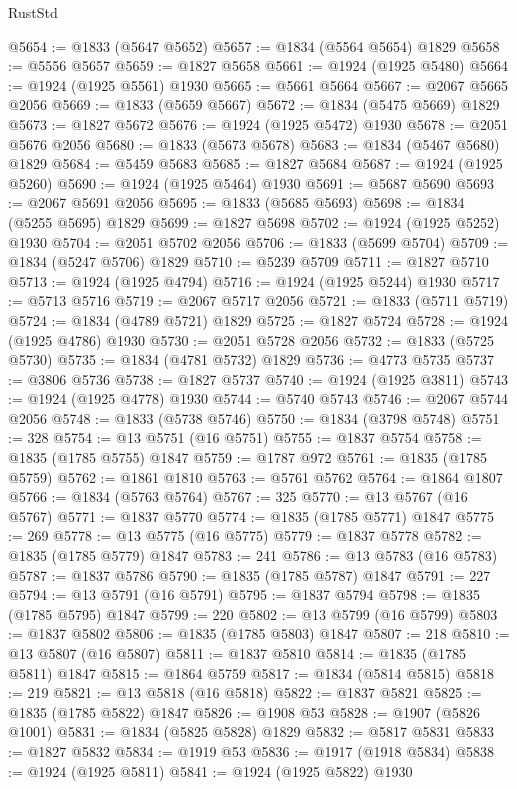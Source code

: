 \begin{lexlean}{RustStd}
\begin{coremodule}
{\begin{coremodule}
{{{{{@5654 := @1833 (@5647 @5652)
@5657 := @1834 (@5564 @5654) @1829
@5658 := @5556 @5657
@5659 := @1827 @5658
@5661 := @1924 (@1925 @5480)
@5664 := @1924 (@1925 @5561) @1930
@5665 := @5661 @5664
@5667 := @2067 @5665 @2056
@5669 := @1833 (@5659 @5667)
@5672 := @1834 (@5475 @5669) @1829
@5673 := @1827 @5672
@5676 := @1924 (@1925 @5472) @1930
@5678 := @2051 @5676 @2056
@5680 := @1833 (@5673 @5678)
@5683 := @1834 (@5467 @5680) @1829
@5684 := @5459 @5683
@5685 := @1827 @5684
@5687 := @1924 (@1925 @5260)
@5690 := @1924 (@1925 @5464) @1930
@5691 := @5687 @5690
@5693 := @2067 @5691 @2056
@5695 := @1833 (@5685 @5693)
@5698 := @1834 (@5255 @5695) @1829
@5699 := @1827 @5698
@5702 := @1924 (@1925 @5252) @1930
@5704 := @2051 @5702 @2056
@5706 := @1833 (@5699 @5704)
@5709 := @1834 (@5247 @5706) @1829
@5710 := @5239 @5709
@5711 := @1827 @5710
@5713 := @1924 (@1925 @4794)
@5716 := @1924 (@1925 @5244) @1930
@5717 := @5713 @5716
@5719 := @2067 @5717 @2056
@5721 := @1833 (@5711 @5719)
@5724 := @1834 (@4789 @5721) @1829
@5725 := @1827 @5724
@5728 := @1924 (@1925 @4786) @1930
@5730 := @2051 @5728 @2056
@5732 := @1833 (@5725 @5730)
@5735 := @1834 (@4781 @5732) @1829
@5736 := @4773 @5735
@5737 := @3806 @5736
@5738 := @1827 @5737
@5740 := @1924 (@1925 @3811)
@5743 := @1924 (@1925 @4778) @1930
@5744 := @5740 @5743
@5746 := @2067 @5744 @2056
@5748 := @1833 (@5738 @5746)
@5750 := @1834 (@3798 @5748)
@5751 := 328
@5754 := @13 @5751 (@16 @5751)
@5755 := @1837 @5754
@5758 := @1835 (@1785 @5755) @1847
@5759 := @1787 @972
@5761 := @1835 (@1785 @5759)
@5762 := @1861 @1810
@5763 := @5761 @5762
@5764 := @1864 @1807
@5766 := @1834 (@5763 @5764)
@5767 := 325
@5770 := @13 @5767 (@16 @5767)
@5771 := @1837 @5770
@5774 := @1835 (@1785 @5771) @1847
@5775 := 269
@5778 := @13 @5775 (@16 @5775)
@5779 := @1837 @5778
@5782 := @1835 (@1785 @5779) @1847
@5783 := 241
@5786 := @13 @5783 (@16 @5783)
@5787 := @1837 @5786
@5790 := @1835 (@1785 @5787) @1847
@5791 := 227
@5794 := @13 @5791 (@16 @5791)
@5795 := @1837 @5794
@5798 := @1835 (@1785 @5795) @1847
@5799 := 220
@5802 := @13 @5799 (@16 @5799)
@5803 := @1837 @5802
@5806 := @1835 (@1785 @5803) @1847
@5807 := 218
@5810 := @13 @5807 (@16 @5807)
@5811 := @1837 @5810
@5814 := @1835 (@1785 @5811) @1847
@5815 := @1864 @5759
@5817 := @1834 (@5814 @5815)
@5818 := 219
@5821 := @13 @5818 (@16 @5818)
@5822 := @1837 @5821
@5825 := @1835 (@1785 @5822) @1847
@5826 := @1908 @53
@5828 := @1907 (@5826 @1001)
@5831 := @1834 (@5825 @5828) @1829
@5832 := @5817 @5831
@5833 := @1827 @5832
@5834 := @1919 @53
@5836 := @1917 (@1918 @5834)
@5838 := @1924 (@1925 @5811)
@5841 := @1924 (@1925 @5822) @1930
}}}}}
\end{coremodule}}
\end{coremodule}
\end{lexlean}
